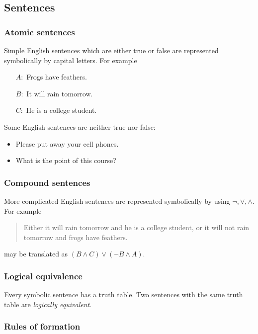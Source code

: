 \documentclass[letterpaper, 11pt]{article}
\theoremstyle{definition}
\begin{document}
\subsection{Sentences}

\subsubsection{Atomic sentences}

Simple English sentences which are either true or false are represented symbolically by capital letters. For example

\begin{itemize}
\item [$A:$] Frogs have feathers. 
\item [$B:$] It will rain tomorrow. 
\item [$C:$] He is a college student.
\end{itemize}

Some English sentences are neither true nor false:

\begin{itemize}
\item Please put away your cell phones.
\item What is the point of this course?
\end{itemize}

\subsubsection{Compound sentences}

More complicated English sentences are represented symbolically by using $\neg, \vee, \wedge$. For example

\begin{quote}
Either it will rain tomorrow and he is a college student, or it will not rain tomorrow and frogs have feathers.
\end{quote}

may be translated as $(B\wedge C) \vee (\neg B \wedge A)$.

\subsubsection{Logical equivalence}

Every symbolic sentence has a truth table. Two sentences with the same truth table are {\em logically equivalent}.


\subsubsection{Rules of formation}
\end{document}
